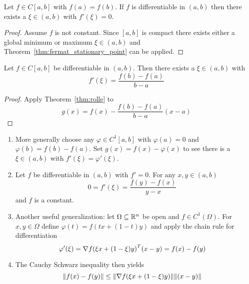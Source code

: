 \begin{theorem}[Rolle]\label{thm:rolle}
    Let \( f \in C[a,b] \) with \( f(a) = f(b) \). If \( f \) is differentiable in \( (a, b) \) then
    there exists a \( \xi \in (a,b) \) with \( f'(\xi) = 0 \).
\end{theorem}

\begin{proof}
    Assume \( f \) is not constant. Since \( [a,b] \) is compact there exists either a global minimum or maximum
    \( \xi \in (a,b) \) and Theorem~\ref{thm:fermat_stationary_point} can be applied.
\end{proof}
\bigskip


\begin{theorem}\label{thm:mean_value}
    Let \( f \in C[a,b] \) be differentiable in \( (a, b) \). Then there exists a \( \xi \in (a,b) \) with
    \[
        f'(\xi) = \frac{f(b) - f(a)}{b - a}
    \]
\end{theorem}

\begin{proof}
    Apply Theorem~\ref{thm:rolle} to
    \[
        g(x) = f(x) - \frac{f(b) - f(a)}{b - a} (x -a)
    \]
\end{proof}
\bigskip


\begin{remarks}\hfill
    \begin{enumerate}
        \item More generally choose any \( \varphi \in C^1[a,b] \) with \( \varphi(a) = 0 \) and
              \( \varphi(b) = f(b) - f(a) \). Set \( g(x) = f(x) - \varphi(x) \) to see there is a \( \xi \in (a,b) \)
              with \( f'(\xi) = \varphi'(\xi)\).
        \item Let \( f \) be differentiable in \( (a, b) \) with \( f' = 0 \). For any \( x, y \in (a, b) \)
              \[
                  0 = f'(\xi) = \frac{f(y) - f(x)}{y - x}
              \]
              and \( f \) is a constant.
        \item Another useful generalization: let \( \Omega \subseteq \mathbb{R}^n \) be open and \( f \in C^1(\Omega) \). For
              \( x, y \in \Omega \) define \( \varphi(t) = f(tx + (1 - t)y) \) and apply the chain rule for differentiation
              \[
                  \varphi'(\xi) = \nabla {f(\xi x + (1 - \xi)y)}^T(x - y) = f(x) - f(y)
              \]
        \item The Cauchy Schwarz inequality then yields
              \[
                  \|f(x) - f(y)\| \le \|\nabla f(\xi x + (1 - \xi)y)\| \|(x - y)\|
              \]
    \end{enumerate}
\end{remarks}
\bigskip


